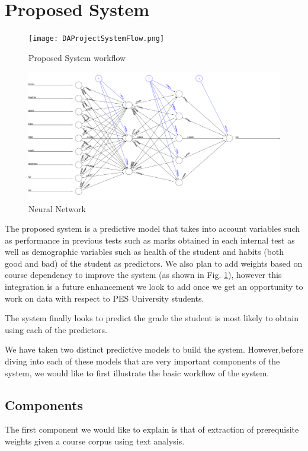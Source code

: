 \documentclass[conference]{IEEEtran}
\begin{document}
	\section{Proposed System}
\begin{figure}
	\texttt{[image: DAProjectSystemFlow.png]}
	\caption{Proposed System workflow}
	\label{fig:DAProjectSystemFlow}
\end{figure}
\begin{figure}
	\includegraphics[width=\linewidth]{neural_net_math.png}
	\caption{Neural Network}
	\label{fig:neural-net}
\end{figure}

The proposed system is a predictive model that takes into account variables such
as performance in previous tests such as marks obtained in each internal test as well as
demographic variables such as health of the student and habits (both good and bad) of
the student as predictors. We also plan to add weights based on course dependency to
improve the system (as shown in Fig. \ref{fig:DAProjectSystemFlow}), however this integration 
is a future enhancement we look to add once we get an opportunity to work on data with respect to
PES University students.

The system finally looks to predict the grade the student is most likely to obtain using
each of the predictors.

We have taken two distinct predictive models to build the system. However,before
diving into each of these models that are very important components of the system, we
would like to first illustrate the basic workflow of the system.

		\subsection{Components}
The first component we would like to explain is that of extraction of prerequisite
weights given a course corpus using text analysis.
\end{document}
